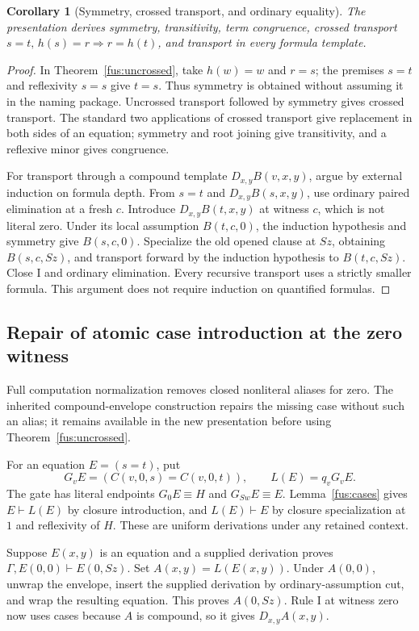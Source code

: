 \documentclass[11pt,letterpaper]{article}
\newtheorem{corollary}[theorem]{Corollary}
\theoremstyle{definition}\newtheorem{definition}[theorem]{Definition}
\theoremstyle{remark}\newtheorem{remark}[theorem]{Remark}
\begin{document}
\begin{corollary}[Symmetry, crossed transport, and ordinary equality]
\label{fus:equality}
The presentation derives symmetry, transitivity, term congruence, crossed
transport $s=t,\,h(s)=r\Rightarrow r=h(t)$, and transport in every formula
template.
\end{corollary}
\begin{proof}
In Theorem~\ref{fus:uncrossed}, take $h(w)=w$ and $r=s$; the premises
$s=t$ and reflexivity $s=s$ give $t=s$. Thus symmetry is obtained without
assuming it in the naming package. Uncrossed transport followed by symmetry
gives crossed transport. The standard two applications of crossed transport
give replacement in both sides of an equation; symmetry and root joining
give transitivity, and a reflexive minor gives congruence.

For transport through a compound template $D_{x,y}B(v,x,y)$, argue by
external induction on formula depth. From $s=t$ and $D_{x,y}B(s,x,y)$,
use ordinary paired elimination at a fresh $c$. Introduce
$D_{x,y}B(t,x,y)$ at witness $c$, which is not literal zero. Under its
local assumption $B(t,c,0)$, the induction hypothesis and symmetry give
$B(s,c,0)$. Specialize the old opened clause at $Sz$, obtaining
$B(s,c,Sz)$, and transport forward by the induction hypothesis to
$B(t,c,Sz)$. Close I and ordinary elimination. Every recursive transport
uses a strictly smaller formula. This argument does not require induction
on quantified formulas.
\end{proof}

\subsection{Repair of atomic case introduction at the zero witness}
\label{fus:repair}

Full computation normalization removes closed nonliteral aliases for zero.
The inherited compound-envelope construction repairs the missing case
without such an alias; it remains available in the new presentation before
using Theorem~\ref{fus:uncrossed}.

For an equation $E=(s=t)$, put
\[
 G_vE=(C(v,0,s)=C(v,0,t)),\qquad L(E)=q_vG_vE.
\]
The gate has literal endpoints $G_0E\equiv H$ and $G_{Sw}E\equiv E$.
Lemma~\ref{fus:cases} gives $E\vdash L(E)$ by closure introduction,
and $L(E)\vdash E$ by closure specialization at $1$ and reflexivity of
$H$. These are uniform derivations under any retained context.

Suppose $E(x,y)$ is an equation and a supplied derivation proves
$\Gamma,E(0,0)\vdash E(0,Sz)$. Set $A(x,y)=L(E(x,y))$.
Under $A(0,0)$, unwrap the envelope, insert the supplied derivation by
ordinary-assumption cut, and wrap the resulting equation. This proves
$A(0,Sz)$. Rule I at witness zero now uses cases because $A$ is compound,
so it gives $D_{x,y}A(x,y)$.
\end{document}
